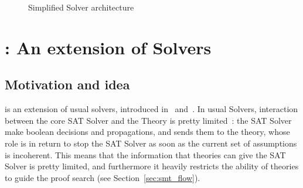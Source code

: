 \documentclass{article}
\begin{document}
\begin{figure}
  \begin{center}
  \end{center}
  \caption{Simplified \smt{} Solver architecture}\label{fig:smt_flow}
\end{figure}

\section{\mcsat{}: An extension of \smt{} Solvers}\label{sec:mcsat}

\subsection{Motivation and idea}

\mcsat{} is an extension of usual \smt{} solvers, introduced in~\cite{VMCAI13} and~\cite{FMCAD13}.
In usual \smt{} Solvers, interaction between the core SAT Solver and the Theory is pretty limited~:
the SAT Solver make boolean decisions and propagations, and sends them to the theory,
whose role is in return to stop the SAT Solver as soon as the current set of assumptions
is incoherent. This means that the information that theories can give the SAT Solver is
pretty limited, and furthermore it heavily restricts the ability of theories to guide
the proof search (see Section~\ref{sec:smt_flow}).
\end{document}
